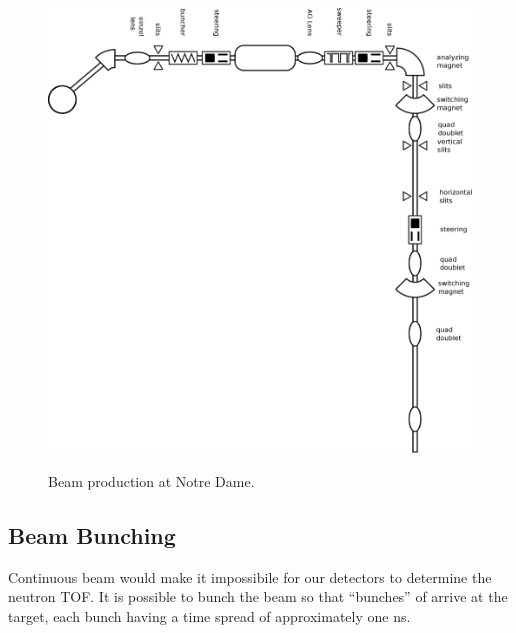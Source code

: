 \begin{figure}[htp]
\centering
\includegraphics[width=1.0\textwidth]{figures/NSL_beamline.eps}
\label{fig:beamline}
\caption{Beam production at Notre Dame.}
\end{figure}

\subsection{Beam Bunching}

Continuous beam would make it impossibile for our detectors to determine the neutron TOF.  It is possible to bunch the beam so that ``bunches'' of  arrive at the target, each bunch having a time spread of approximately one ns.  

